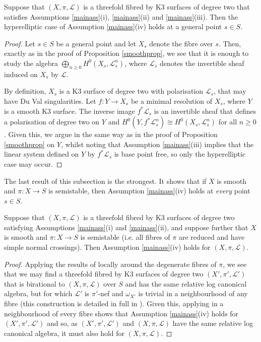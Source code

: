 \documentclass{amsart}
\begin{document}
\begin{prop} \label{hyperprop} Suppose that $(X,\pi,{\mathcal{L}})$ is a threefold fibred by K3 surfaces of degree two that satisfies Assumptions \ref{mainass}\textup{(}i\textup{)}, \ref{mainass}\textup{(}ii\textup{)} and \ref{mainass}\textup{(}iii\textup{)}. Then the hyperelliptic case of Assumption \ref{mainass}\textup{(}iv\textup{)} holds at a general point $s \in S$.
\end{prop}
\begin{proof} Let $s \in S$ be a general point and let $X_s$ denote the fibre over $s$. Then, exactly as in the proof of Proposition \ref{smoothprop}, we see that it is enough to study the algebra $\bigoplus_{n \geq 0} H^0(X_s, {\mathcal{L}}_s^n)$, where ${\mathcal{L}}_s$ denotes the invertible sheaf induced on $X_s$ by ${\mathcal{L}}$.  

By definition, $X_s$ is a K3 surface of degree two with polarisation ${\mathcal{L}}_s$, that may have Du Val singularities. Let $f\colon Y \to X_s$ be a minimal resolution of $X_s$, where $Y$ is a smooth K3 surface. The inverse image $f^*{\mathcal{L}}_s$ is an invertible sheaf that defines a polarisation of degree two on $Y$ and $H^0(Y, f^*{\mathcal{L}}_s^n)\cong H^0(X_s, {\mathcal{L}}_s^n)$ for all $n\geq0$. Given this, we argue in the same way as in the proof of Proposition \ref{smoothprop} on $Y$, whilst noting that Assumption \ref{mainass}(iii) implies that the linear system defined on $Y$ by $f^*{\mathcal{L}}_s$ is base point free, so only the hyperelliptic case may occur.\end{proof}

The last result of this subsection is the strongest. It shows that if $X$ is smooth and $\pi\colon X \to S$ is semistable, then Assumption \ref{mainass}(iv) holds at \emph{every} point $s \in S$. 

\begin{thm} Suppose that $(X,\pi,{\mathcal{L}})$ is a threefold fibred by K3 surfaces of degree two satisfying Assumptions \ref{mainass}\textup{(}i\textup{)} and \ref{mainass}\textup{(}ii\textup{)}, and suppose further that $X$ is smooth and $\pi\colon X \to S$ is semistable \textup{(}i.e. all fibres of $\pi$ are reduced and have simple normal crossings\textup{)}. Then Assumption \ref{mainass}\textup{(}iv\textup{)} holds for $(X,\pi,{\mathcal{L}})$.
\end{thm}
\begin{proof} Applying the results of \cite[Section 2]{dk3sd2} locally around the degenerate fibres of $\pi$, we see that we may find a threefold fibred by K3 surfaces of degree two $(X',\pi',{\mathcal{L}}')$ that is birational to $(X,\pi,{\mathcal{L}})$ over $S$ and has the same relative log canonical algebra, but for which ${\mathcal{L}}'$ is $\pi'$-nef and $\omega_{X'}$ is trivial in a neighbourhood of any fibre (this construction is detailed in full in \cite[Section 2.4]{mythesis}). Given this, applying \cite[Theorem 3.1]{dk3sd2} in a neighbourhood of every fibre shows that Assumption \ref{mainass}(iv) holds for $(X',\pi',{\mathcal{L}}')$ and so, as $(X',\pi',{\mathcal{L}}')$ and $(X,\pi,{\mathcal{L}})$ have the same relative log canonical algebra, it must also hold for $(X,\pi,{\mathcal{L}})$.
\end{proof}
\end{document}
